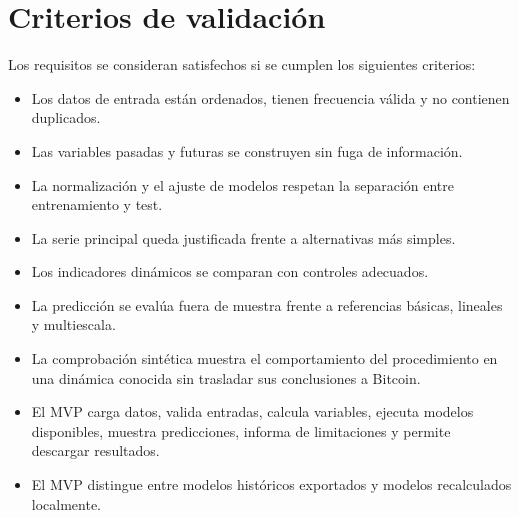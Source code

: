 \section{Criterios de validación}\label{sec:criterios-validacion}

Los requisitos se consideran satisfechos si se cumplen los siguientes criterios:

\begin{itemize}
    \item Los datos de entrada están ordenados, tienen frecuencia válida y no contienen duplicados.
    \item Las variables pasadas y futuras se construyen sin fuga de información.
    \item La normalización y el ajuste de modelos respetan la separación entre entrenamiento y test.
    \item La serie principal queda justificada frente a alternativas más simples.
    \item Los indicadores dinámicos se comparan con controles adecuados.
    \item La predicción se evalúa fuera de muestra frente a referencias básicas, lineales y multiescala.
    \item La comprobación sintética muestra el comportamiento del procedimiento en una dinámica conocida sin trasladar sus conclusiones a Bitcoin.
    \item El MVP carga datos, valida entradas, calcula variables, ejecuta modelos disponibles, muestra predicciones, informa de limitaciones y permite descargar resultados.
    \item El MVP distingue entre modelos históricos exportados y modelos recalculados localmente.
\end{itemize}
